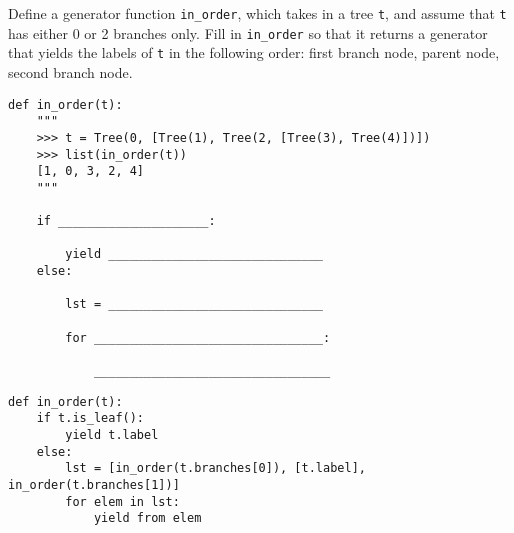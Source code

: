 \begin{blocksection}
\question
Define a generator function \lstinline{in_order}, which takes in a tree \lstinline{t}, and assume that \lstinline{t} has either 0 or 2 branches only. Fill in \lstinline{in_order} so that it returns a generator that yields the labels of \lstinline{t} in the following order: first branch node, parent node, second branch node.

\begin{lstlisting}
def in_order(t):
    """
    >>> t = Tree(0, [Tree(1), Tree(2, [Tree(3), Tree(4)])])
    >>> list(in_order(t))
    [1, 0, 3, 2, 4]
    """

    if _____________________:

        yield ______________________________
    else:

        lst = ______________________________

        for ________________________________:

            _________________________________
\end{lstlisting}
\end{blocksection}

\begin{blocksection}
\begin{solution}
\begin{lstlisting}
def in_order(t):
    if t.is_leaf():
        yield t.label
    else:
        lst = [in_order(t.branches[0]), [t.label], in_order(t.branches[1])]
        for elem in lst:
            yield from elem
\end{lstlisting}
\end{solution}
\end{blocksection}